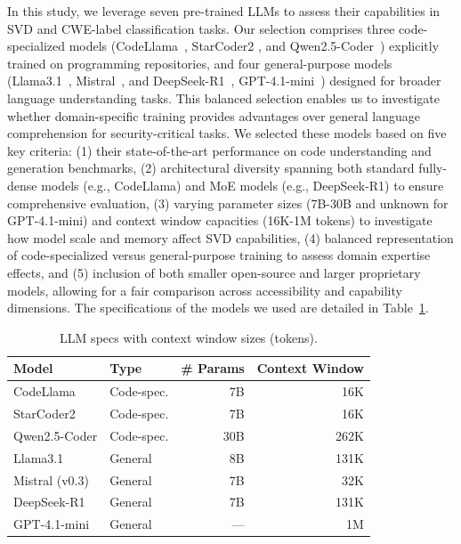 \documentclass[lettersize,journal]{IEEEtran}
\begin{document}
In this study, we leverage seven pre-trained \glspl{LLM} to assess their capabilities in \gls{SVD} and CWE-label classification tasks. Our selection comprises three code-specialized models (CodeLlama~\cite{roziere2023code}, StarCoder2 \cite{lozhkov2024starcoder}, and Qwen2.5-Coder~\cite{yang2025qwen3}) explicitly trained on programming repositories, and four general-purpose models (Llama3.1~\cite{dubey2024llama}, Mistral~\cite{jiang2023mistral7b}, and DeepSeek-R1~\cite{guo2025deepseek}, GPT-4.1-mini~\cite{openai2025gpt4_1mini}) designed for broader language understanding tasks. This balanced selection enables us to investigate whether domain-specific training provides advantages over general language comprehension for security-critical tasks. We selected these models based on five key criteria: (1) their state-of-the-art performance on code understanding and generation benchmarks, (2) architectural diversity spanning both standard fully-dense models (e.g., CodeLlama) and \gls{MoE} models (e.g., DeepSeek-R1) to ensure comprehensive evaluation, (3) varying parameter sizes (7B-30B and unknown for GPT-4.1-mini) and context window capacities (16K-1M tokens) to investigate how model scale and memory affect \gls{SVD} capabilities, (4) balanced representation of code-specialized versus general-purpose training to assess domain expertise effects, and (5) inclusion of both smaller open-source and larger proprietary models, allowing for a fair comparison across accessibility and capability dimensions. The specifications of the models we used are detailed in Table~\ref{table:llm-specs}.

\begin{table}[!t]
\centering
\caption{LLM specs with context window sizes (tokens).}
\label{table:llm-specs}
\footnotesize
\setlength{\tabcolsep}{6pt}
\renewcommand{\arraystretch}{1.1}
\begin{tabular}{@{}l l r r@{}}
\toprule
\textbf{Model} & \textbf{Type} & \textbf{\# Params} & \textbf{Context Window} \\
\midrule
CodeLlama & Code-spec. & 7B & 16K \\
StarCoder2 & Code-spec. & 7B & 16K \\
Qwen2.5-Coder & Code-spec. & 30B & 262K \\
Llama3.1 & General & 8B & 131K \\
Mistral (v0.3) & General & 7B & 32K \\
DeepSeek-R1 & General & 7B & 131K \\
GPT-4.1-mini & General & --- & 1M \\
\bottomrule
\end{tabular}
\end{table}
\end{document}
